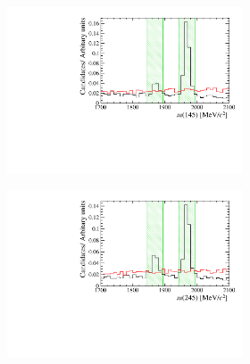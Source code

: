 \begin{figure}[!h]
   \begin{subfigure}[t]{1.0\textwidth}
      \centering
      \begin{subfigure}[t]{0.32\textwidth}
         \includegraphics[width=1.0\textwidth]{figs/Selection/Veto_Comparison_B2DsPhi_Ds2PiPiPi_m145.pdf}
      \end{subfigure}
      \begin{subfigure}[t]{0.32\textwidth}
         \includegraphics[width=1.0\textwidth]{figs/Selection/Veto_Comparison_B2DsPhi_Ds2PiPiPi_m245.pdf}
      \end{subfigure}
      \begin{subfigure}[t]{0.32\textwidth}

\end{subfigure}
\end{subfigure}
\end{figure}

